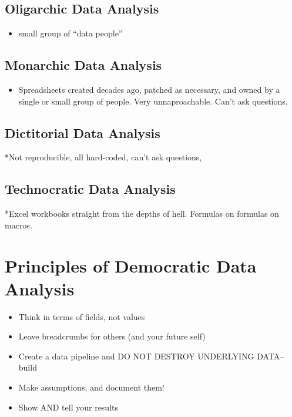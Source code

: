 \documentclass[]{book}
\providecommand{\tightlist}{%
  \setlength{\itemsep}{0pt}\setlength{\parskip}{0pt}}
\begin{document}
\subsection{Oligarchic Data Analysis}\label{oligarchic-data-analysis}

\begin{itemize}
\tightlist
\item
  small group of ``data people''
\end{itemize}

\subsection{Monarchic Data Analysis}\label{monarchic-data-analysis}

\begin{itemize}
\tightlist
\item
  Spreadsheets created decades ago, patched as necessary, and owned by a
  single or small group of people. Very unnaproachable. Can't ask
  questions.
\end{itemize}

\subsection{Dictitorial Data Analysis}\label{dictitorial-data-analysis}

*Not reproducible, all hard-coded, can't ask questions,

\subsection{Technocratic Data
Analysis}\label{technocratic-data-analysis}

*Excel workbooks straight from the depths of hell. Formulas on formulas
on macros.

\section{Principles of Democratic Data
Analysis}\label{principles-of-democratic-data-analysis}

\begin{itemize}
\tightlist
\item
  Think in terms of fields, not values
\item
  Leave breadcrumbs for others (and your future self)
\item
  Create a data pipeline and DO NOT DESTROY UNDERLYING DATA-- build
\item
  Make assumptions, and document them!
\item
  Show AND tell your results
\end{itemize}
\end{document}
